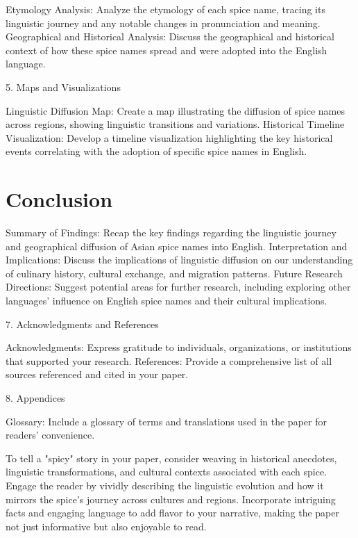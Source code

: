 \documentclass{dsh} %
\begin{document}
Etymology Analysis: Analyze the etymology of each spice name, tracing its linguistic journey and any notable changes in pronunciation and meaning.
Geographical and Historical Analysis: Discuss the geographical and historical context of how these spice names spread and were adopted into the English language.

5. Maps and Visualizations

Linguistic Diffusion Map: Create a map illustrating the diffusion of spice names across regions, showing linguistic transitions and variations.
Historical Timeline Visualization: Develop a timeline visualization highlighting the key historical events correlating with the adoption of specific spice names in English.

\section{Conclusion}

Summary of Findings: Recap the key findings regarding the linguistic journey and geographical diffusion of Asian spice names into English.
Interpretation and Implications: Discuss the implications of linguistic diffusion on our understanding of culinary history, cultural exchange, and migration patterns.
Future Research Directions: Suggest potential areas for further research, including exploring other languages' influence on English spice names and their cultural implications.

7. Acknowledgments and References

Acknowledgments: Express gratitude to individuals, organizations, or institutions that supported your research.
References: Provide a comprehensive list of all sources referenced and cited in your paper.

8. Appendices

Glossary: Include a glossary of terms and translations used in the paper for readers' convenience.

To tell a "spicy" story in your paper, consider weaving in historical anecdotes, linguistic transformations, and cultural contexts associated with each spice. Engage the reader by vividly describing the linguistic evolution and how it mirrors the spice's journey across cultures and regions. Incorporate intriguing facts and engaging language to add flavor to your narrative, making the paper not just informative but also enjoyable to read.



\printbibliography

\theendnotes
\end{document}
